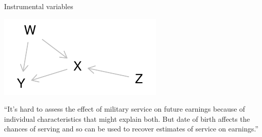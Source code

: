 \documentclass[
  11pt,
  ignorenonframetext,
]{beamer}
\begin{document}
\begin{frame}{Instrumental variables}
\protect\hypertarget{instrumental-variables}{}
\begin{center}\includegraphics[height=0.5\textheight]{_nodes_and_claims_files/figure-beamer/unnamed-chunk-7-1} \end{center}

``It's hard to assess the effect of military service on future earnings
because of individual characteristics that might explain both. But date
of birth affects the chances of serving and so can be used to recover
estimates of service on earnings.''
\end{frame}
\end{document}
